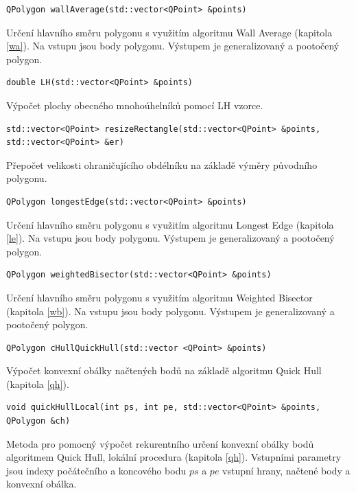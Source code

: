 \documentclass[a4paper, 12pt, oneside, titlepage]{article} %
\begin{document}
\begin{verbatim}
QPolygon wallAverage(std::vector<QPoint> &points)
\end{verbatim}
Určení hlavního směru polygonu s využitím algoritmu Wall Average (kapitola \ref{wa}). Na vstupu jsou body polygonu. Výstupem je generalizovaný a pootočený polygon.\\

\begin{verbatim}
double LH(std::vector<QPoint> &points)
\end{verbatim}
Výpočet plochy obecného mnohoúhelníků pomocí LH vzorce.\\ 

\begin{verbatim}
std::vector<QPoint> resizeRectangle(std::vector<QPoint> &points, std::vector<QPoint> &er)
\end{verbatim}
Přepočet velikosti ohraničujícího obdélníku na základě výměry původního polygonu.\\

\begin{verbatim}
QPolygon longestEdge(std::vector<QPoint> &points)
\end{verbatim}
Určení hlavního směru polygonu s využitím algoritmu Longest Edge (kapitola \ref{le}). Na vstupu jsou body polygonu. Výstupem je generalizovaný a pootočený polygon.\\

\begin{verbatim}
QPolygon weightedBisector(std::vector<QPoint> &points)
\end{verbatim}
Určení hlavního směru polygonu s využitím algoritmu Weighted Bisector (kapitola \ref{wb}). Na vstupu jsou body polygonu. Výstupem je generalizovaný a pootočený polygon.\\

\begin{verbatim}
QPolygon cHullQuickHull(std::vector <QPoint> &points)
\end{verbatim}
Výpočet konvexní obálky načtených bodů na základě algoritmu Quick Hull (kapitola \ref{qh}).\\

\begin{verbatim}
void quickHullLocal(int ps, int pe, std::vector<QPoint> &points, QPolygon &ch)
\end{verbatim}
Metoda pro pomocný výpočet rekurentního určení konvexní obálky bodů algoritmem Quick Hull, lokální procedura (kapitola \ref{qh}). Vstupními parametry jsou indexy počátečního a koncového bodu $ps$ a $pe$ vstupní hrany, načtené body a konvexní obálka.\\
\end{document}
